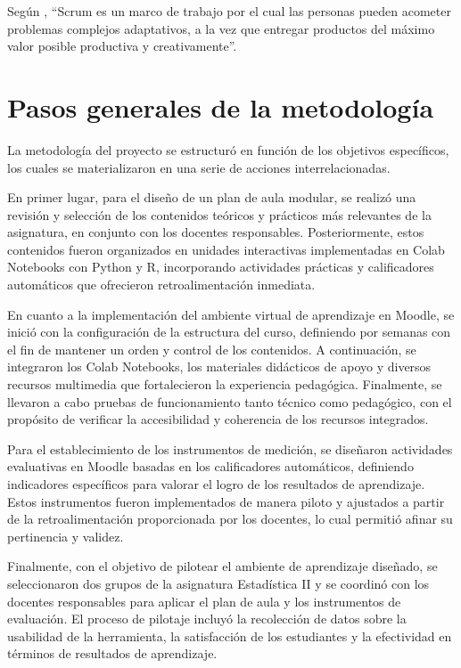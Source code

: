 \documentclass[letter,oneside,12pt,spanish]{report}
\begin{document}
Según \cite{schwaber2013scrum}, ``Scrum es un marco de trabajo por el cual las personas pueden acometer problemas complejos adaptativos, a la vez que entregar productos del máximo valor posible productiva y creativamente''.

\section{Pasos generales de la metodología}

La metodología del proyecto se estructuró en función de los objetivos específicos, los cuales se materializaron en una serie de acciones interrelacionadas.

En primer lugar, para el diseño de un plan de aula modular, se realizó una revisión y selección de los contenidos teóricos y prácticos más relevantes de la asignatura, en conjunto con los docentes responsables. Posteriormente, estos contenidos fueron organizados en unidades interactivas implementadas en Colab Notebooks con Python y R, incorporando actividades prácticas y calificadores automáticos que ofrecieron retroalimentación inmediata.

En cuanto a la implementación del ambiente virtual de aprendizaje en Moodle, se inició con la configuración de la estructura del curso, definiendo por semanas con el fin de mantener un orden y control de los contenidos. A continuación, se integraron los Colab Notebooks, los materiales didácticos de apoyo y diversos recursos multimedia que fortalecieron la experiencia pedagógica. Finalmente, se llevaron a cabo pruebas de funcionamiento tanto técnico como pedagógico, con el propósito de verificar la accesibilidad y coherencia de los recursos integrados.

Para el establecimiento de los instrumentos de medición, se diseñaron actividades evaluativas en Moodle basadas en los calificadores automáticos, definiendo indicadores específicos para valorar el logro de los resultados de aprendizaje. Estos instrumentos fueron implementados de manera piloto y ajustados a partir de la retroalimentación proporcionada por los docentes, lo cual permitió afinar su pertinencia y validez.

Finalmente, con el objetivo de pilotear el ambiente de aprendizaje diseñado, se seleccionaron dos grupos de la asignatura Estadística II y se coordinó con los docentes responsables para aplicar el plan de aula y los instrumentos de evaluación. El proceso de pilotaje incluyó la recolección de datos sobre la usabilidad de la herramienta, la satisfacción de los estudiantes y la efectividad en términos de resultados de aprendizaje.
\end{document}
